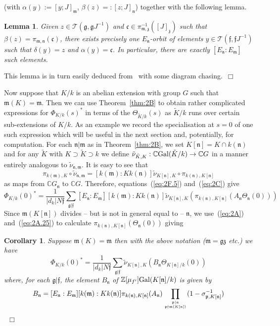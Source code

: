 \documentclass[12pt]{article}
\newtheorem{cor}{Corollary}[section]
\newtheorem{lemma}{Lemma}[section]
\newcounter{example}[section]
\newcounter{rem}[section]%
\newcommand{\bbC}{\ensuremath{\mathbb{C}}}
\newcommand{\bbZ}{\ensuremath{\mathbb{Z}}}
\newcommand{\beql}[1]{\begin{equation}\label{#1}}
\newcommand{\cT}{\ensuremath{\mathcal{T}}}
\newcommand{\eeq}{\end{equation}}
\newcommand{\ePf}{\hspace*{\fill}~$\Box$\vertsp\par}%
\newcommand{\etc}{\emph{etc.}}
\newcommand{\fc}{\ensuremath{\mathfrak{c}}}
\newcommand{\ff}{\ensuremath{\mathfrak{f}}}
\newcommand{\fg}{\ensuremath{\mathfrak{g}}}
\newcommand{\fm}{\ensuremath{\mathfrak{m}}}
\newcommand{\fn}{\ensuremath{\mathfrak{n}}}
\newcommand{\fp}{\ensuremath{\mathfrak{p}}}
\newcommand{\fz}{\ensuremath{\mathfrak{z}}}
\newcommand{\Gal}{{\rm Gal}}
\newcommand{\inv}{^{-1}}%
\newcommand{\ndiv}{\nmid}
\newcommand{\refeq}[1]{~(\ref{eq:#1})}
\newcommand{\rem}{\refstepcounter{rem}\noindent{\sc Remark \therem}}%
\renewcommand{\therem}{\thesection.\arabic{rem}}
\newcommand{\vertsp}{\vspace{1ex}}
\newcommand{\PhiKk}{\ensuremath{\Phi_{K/k}}}
\newcommand{\PhiKko}{\ensuremath{\Phi_{K/k}(0)}}
\newcommand{\tK}{\ensuremath{\tilde{K}}}
\begin{document}
(with $\alpha(y):=[y;J]_\fm$, $\beta(z)=:[z;J]_{\fn}$) together with the following lemma.
\begin{lemma}
Given $z\in \cT(\fg,\fg J\inv)$ and $\fc\in \pi_{\fm,\fz}\inv([J]_\fz)$ such that
$\beta(z)=\pi_{\fm,\fn}(\fc)$, there exists precisely one $E_{\fn}$-orbit of elements
$y\in \cT(\ff,\ff J\inv)$ such that $\delta(y)=z$ and $\alpha(y)=\fc$. In particular,
there are exactly $[E_{\fn}:E_\fm]$ such elements.
\end{lemma}
This lemma is in turn easily deduced from~\cite[Prop./Def.~6.1]{twizas}
with some diagram chasing.\ePf
\noindent Now suppose that $K/k$ is an abelian extension with group $G$ such that $\fm(K)=\fm$.
Then we can use Theorem~\ref{thm:2B} to obtain rather complicated expressions
for $\PhiKk(s)^\ast$ in terms of the $\Theta_{\tK/k}(s)$ as $\tK/k$ runs over certain sub-extensions
of $K/k$. As an example we record the specialisation at $s=0$ of one
such expression which will be useful in the next section and, potentially, for
computation.
For each $\fn|\fm$ as in Theorem~\ref{thm:2B},
we set $K[\fn]=K\cap k(\fn)$ and for any $\tilde{K}$ with $K\supset \tilde{K}\supset k$
we define $\tilde{\nu}_{\tilde{K},K}:\bbC \Gal(\tilde{K}/k)\rightarrow \bbC G$ in a manner
entirely analogous to $\tilde{\nu}_{\fn,\fm}$. It is easy to see that
\[
\pi_{k(\fm),K}\circ\tilde{\nu}_{\fn,\fm}=[k(\fm):Kk(\fn)]\tilde{\nu}_{K[\fn],K}
\circ \pi_{k(\fn),K[\fn]}
\]
as maps from $\bbC G_{\fn}$ to $\bbC G$.
Therefore, equations\refeq{2F.5} and\refeq{2C} give
\[
\PhiKko^\ast=\frac{1}{|d_k|N\ff}\sum_{\fg|\ff}[E_{\fn}:E_{\fm}][k(\fm):Kk(\fn)]
\tilde{\nu}_{K[\fn],K}
(\pi_{k(\fn),K[\fn]}(A_{\fn}\Theta_{\fn}(0)))
\]
Since $\fm(K[\fn])$ divides -- but is not in general equal to -- $\fn$, we use\refeq{2A}
and\refeq{2A.25} to calculate $\pi_{k(\fn),K[\fn]}(\Theta_{\fn}(0))$ giving
\begin{cor}\label{cor:2A} Suppose $\fm(K)=\fm$ then with the above notation
($\fm=\fg\fz$ \etc) we have
\beql{eq:2J.5}
\PhiKko^\ast=\frac{1}{|d_k|N\ff}\sum_{\fg|\ff}
\tilde{\nu}_{K[\fn],K}
(B_{\fn}\Theta_{K[\fn]/k}(0))
\eeq
where, for each $\fg|\ff$, the element $B_{\fn}$ of $\bbZ[\mu_{f'}]\Gal(K[\fn]/k)$
is given by
\[
B_{\fn}=[E_{\fn}:E_{\fm}][k(\fm):Kk(\fn)]\pi_{k(\fn),K[\fn]}(A_{\fn})
\prod_{\fp|\fn\atop\fp\ndiv\fm(K[\fn])}(1-\sigma_{\fp,K[\fn]}\inv)
\]
\ePf
\end{cor}
\end{document}
